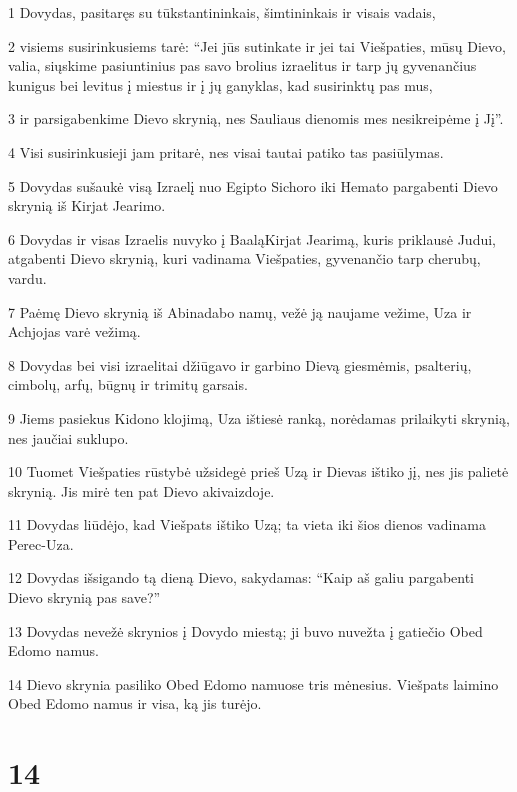\par 1 Dovydas, pasitaręs su tūkstantininkais, šimtininkais ir visais vadais, 
\par 2 visiems susirinkusiems tarė: “Jei jūs sutinkate ir jei tai Viešpaties, mūsų Dievo, valia, siųskime pasiuntinius pas savo brolius izraelitus ir tarp jų gyvenančius kunigus bei levitus į miestus ir į jų ganyklas, kad susirinktų pas mus, 
\par 3 ir parsigabenkime Dievo skrynią, nes Sauliaus dienomis mes nesikreipėme į Jį”. 
\par 4 Visi susirinkusieji jam pritarė, nes visai tautai patiko tas pasiūlymas. 
\par 5 Dovydas sušaukė visą Izraelį nuo Egipto Sichoro iki Hemato pargabenti Dievo skrynią iš Kirjat Jearimo. 
\par 6 Dovydas ir visas Izraelis nuvyko į Baalą­Kirjat Jearimą, kuris priklausė Judui, atgabenti Dievo skrynią, kuri vadinama Viešpaties, gyvenančio tarp cherubų, vardu. 
\par 7 Paėmę Dievo skrynią iš Abinadabo namų, vežė ją naujame vežime, Uza ir Achjojas varė vežimą. 
\par 8 Dovydas bei visi izraelitai džiūgavo ir garbino Dievą giesmėmis, psalterių, cimbolų, arfų, būgnų ir trimitų garsais. 
\par 9 Jiems pasiekus Kidono klojimą, Uza ištiesė ranką, norėdamas prilaikyti skrynią, nes jaučiai suklupo. 
\par 10 Tuomet Viešpaties rūstybė užsidegė prieš Uzą ir Dievas ištiko jį, nes jis palietė skrynią. Jis mirė ten pat Dievo akivaizdoje. 
\par 11 Dovydas liūdėjo, kad Viešpats ištiko Uzą; ta vieta iki šios dienos vadinama Perec-Uza. 
\par 12 Dovydas išsigando tą dieną Dievo, sakydamas: “Kaip aš galiu pargabenti Dievo skrynią pas save?” 
\par 13 Dovydas nevežė skrynios į Dovydo miestą; ji buvo nuvežta į gatiečio Obed Edomo namus. 
\par 14 Dievo skrynia pasiliko Obed Edomo namuose tris mėnesius. Viešpats laimino Obed Edomo namus ir visa, ką jis turėjo.



\chapter{14}


